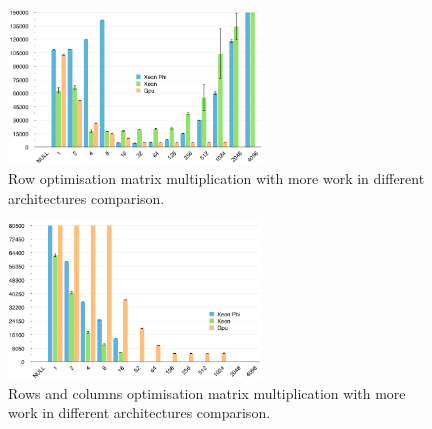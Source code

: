 \begin{figure}[!h]
    \centering
    \includegraphics[width=0.6\textwidth]{figures/opt2_comp.png}
    \caption{Row optimisation matrix multiplication with more work in different architectures comparison.}
    \label{RowsComp}
\end{figure}

\begin{figure}[!h]
    \centering
    \includegraphics[width=0.6\textwidth]{figures/opt3_comp.png}
    \caption{Rows and columns optimisation matrix multiplication with more work in different architectures comparison.}
    \label{RowsColsComp}
\end{figure}








